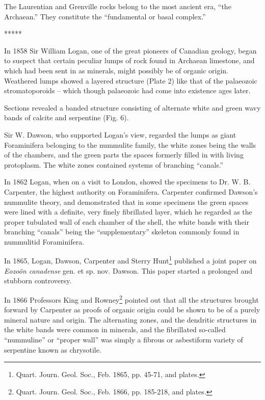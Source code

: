 \documentclass[a4paper, 12pt, oneside]{article}
\begin{document}
The Laurentian and Grenville rocks belong to the most ancient era, ``the Archaean.'' They constitute the ``fundamental or basal complex.''

\centerline{*\hspace{15mm}*\hspace{15mm}*\hspace{15mm}*\hspace{15mm}*}
\bigskip

In 1858 Sir William Logan, one of the great pioneers of Canadian geology, began to suspect that certain peculiar lumps of rock found in Archaean limestone, and which had been sent in as minerals, might possibly be of organic origin. Weathered lumps showed a layered structure (Plate 2) like that of the palaeozoic stromatoporoids -- which though palaeozoic had come into existence ages later.

Sections revealed a banded structure consisting of alternate white and green wavy bands of calcite and serpentine (Fig. 6).

Sir W. Dawson, who supported Logan's view, regarded the lumps as giant Foraminifera belonging to the nummulite family, the white zones being the walls of the chambers, and the green parts the spaces formerly filled in with living protoplasm. The white zones contained systems of branching ``canals.''

In 1862 Logan, when on a visit to London, showed the specimens to Dr. W. B. Carpenter, the highest authority on Foraminifera. Carpenter confirmed Dawson's nummulite theory, and demonstrated that in some specimens the green spaces were lined with a definite, very finely fibrillated layer, which he regarded as the proper tubulated wall of each chamber of the shell, the white bands with their branching ``canals'' being the ``supplementary'' skeleton commonly found in nummulitid Foraminifera.

In 1865, Logan, Dawson, Carpenter and Sterry Hunt\footnote{Quart. Journ. Geol. Soc., Feb. 1865, pp. 45-71, and plates.} published a joint paper on \emph{Eozoön canadense} gen. et sp. nov. Dawson. This paper started a prolonged and stubborn controversy.

In 1866 Professors King and Rowney\footnote{Quart. Journ. Geol. Soc., Feb. 1866, pp. 185-218, and plates.} pointed out that all the structures brought forward by Carpenter as proofs of organic origin could be shown to be of a purely mineral nature and origin. The alternating zones, and the dendritic structures in the white bands were common in minerals, and the fibrillated so-called ``nummuline'' or ``proper wall'' was simply a fibrous or asbestiform variety of serpentine known as chrysotile.
\end{document}
